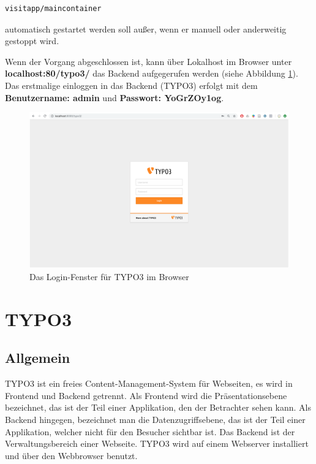 \begin{lstlisting}[style=MyBashStyle, caption={Angabe des Docker Containers}]
visitapp/maincontainer
\end{lstlisting} automatisch gestartet werden soll außer, wenn er manuell oder anderweitig gestoppt wird.

Wenn der Vorgang abgeschlossen ist, kann über Lokalhost im Browser unter \textbf{localhost:80/typo3/} das Backend aufgegerufen werden (siehe Abbildung \ref{img:typo_3_login}). Das erstmalige einloggen in das Backend (TYPO3) erfolgt mit dem \textbf{Benutzername: admin} und \textbf{Passwort: YoGrZOy1og}.

\begin{figure}[ht!]
\centering
\includegraphics[width=12cm]{Figures/paula/typo3/typo_3_login.png}
\caption{Das Login-Fenster für TYPO3 im Browser}
\label{img:typo_3_login}
\end{figure}


\cleardoublepage

\section{TYPO3}
\subsection{Allgemein}

TYPO3 ist ein freies Content-Management-System für Webseiten, es wird in Frontend und Backend getrennt. Als Frontend wird die Präsentationsebene bezeichnet, das ist der Teil einer Applikation, den der Betrachter sehen kann. Als Backend hingegen, bezeichnet man die Datenzugriffsebene, das ist der Teil einer Applikation, welcher nicht für den Besucher sichtbar ist. Das Backend ist der Verwaltungsbereich einer Webseite. TYPO3 wird auf einem Webserver installiert und über den Webbrowser benutzt.

